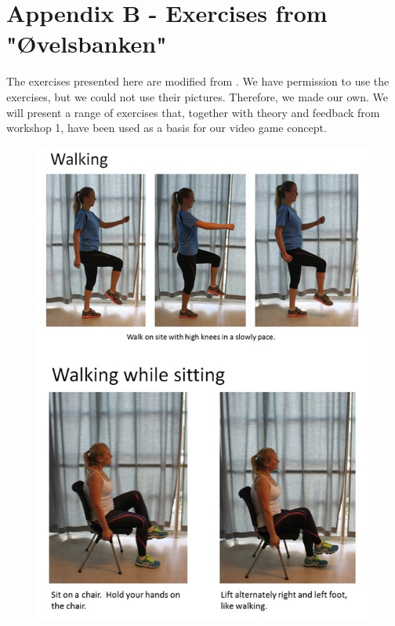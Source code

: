 \newpage
\section*{Appendix B - Exercises from "{Ø}velsbanken"}
\label{app:exercises}

The exercises presented here are modified from \cite{eldretrening}. We have permission to use the exercises, but we could not use their pictures. Therefore, we made our own. We will present a range of exercises that, together with theory and feedback from workshop 1, have been used as a basis for our video game concept.
\newpage

\begin{figure} [H]
\centering
\includegraphics[scale=0.7]{Walking.jpg}
\label{app:walking}
\end{figure} 

